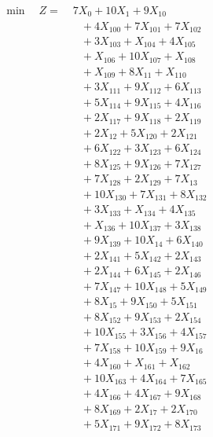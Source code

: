 \documentclass[a4paper,10pt]{article}
\begin{document}
\allowdisplaybreaks
{\small
\begin{align}
\min \quad Z = &\; 7X_{0} + 10X_{1} + 9X_{10} \\[0.5ex]
&\quad  + 4X_{100} + 7X_{101} + 7X_{102} \\[0.5ex]
&\quad  + 3X_{103} + X_{104} + 4X_{105} \\[0.5ex]
&\quad  + X_{106} + 10X_{107} + X_{108} \\[0.5ex]
&\quad  + X_{109} + 8X_{11} + X_{110} \\[0.5ex]
&\quad  + 3X_{111} + 9X_{112} + 6X_{113} \\[0.5ex]
&\quad  + 5X_{114} + 9X_{115} + 4X_{116} \\[0.5ex]
&\quad  + 2X_{117} + 9X_{118} + 2X_{119} \\[0.5ex]
&\quad  + 2X_{12} + 5X_{120} + 2X_{121} \\[0.5ex]
&\quad  + 6X_{122} + 3X_{123} + 6X_{124} \\[0.5ex]
&\quad  + 8X_{125} + 9X_{126} + 7X_{127} \\[0.5ex]
&\quad  + 7X_{128} + 2X_{129} + 7X_{13} \\[0.5ex]
&\quad  + 10X_{130} + 7X_{131} + 8X_{132} \\[0.5ex]
&\quad  + 3X_{133} + X_{134} + 4X_{135} \\[0.5ex]
&\quad  + X_{136} + 10X_{137} + 3X_{138} \\[0.5ex]
&\quad  + 9X_{139} + 10X_{14} + 6X_{140} \\[0.5ex]
&\quad  + 2X_{141} + 5X_{142} + 2X_{143} \\[0.5ex]
&\quad  + 2X_{144} + 6X_{145} + 2X_{146} \\[0.5ex]
&\quad  + 7X_{147} + 10X_{148} + 5X_{149} \\[0.5ex]
&\quad  + 8X_{15} + 9X_{150} + 5X_{151} \\[0.5ex]
&\quad  + 8X_{152} + 9X_{153} + 2X_{154} \\[0.5ex]
&\quad  + 10X_{155} + 3X_{156} + 4X_{157} \\[0.5ex]
&\quad  + 7X_{158} + 10X_{159} + 9X_{16} \\[0.5ex]
&\quad  + 4X_{160} + X_{161} + X_{162} \\[0.5ex]
&\quad  + 10X_{163} + 4X_{164} + 7X_{165} \\[0.5ex]
&\quad  + 4X_{166} + 4X_{167} + 9X_{168} \\[0.5ex]
&\quad  + 8X_{169} + 2X_{17} + 2X_{170} \\[0.5ex]
&\quad  + 5X_{171} + 9X_{172} + 8X_{173} \\[0.5ex]

\end{align}}
\end{document}
